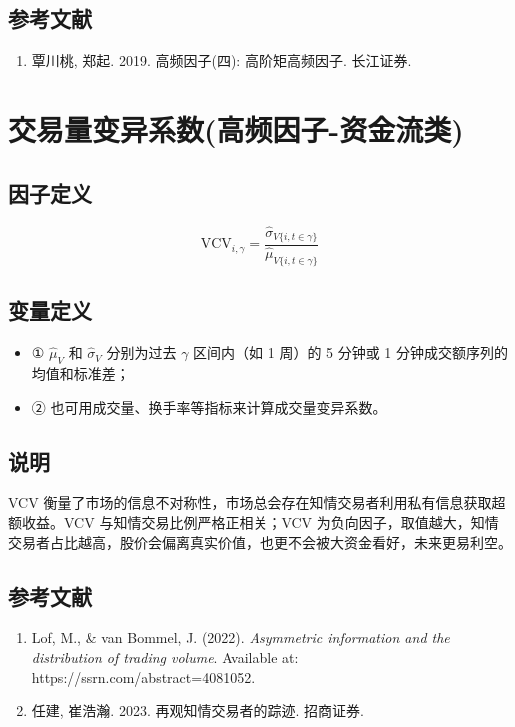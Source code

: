 \documentclass{article}
\begin{document}
\subsection{参考文献}
\begin{enumerate}
    \item 覃川桃, 郑起. 2019. 高频因子(四): 高阶矩高频因子. 长江证券.
\end{enumerate}

\section{交易量变异系数(高频因子-资金流类)}

\subsection{因子定义}
\begin{equation}
    \mathrm{VCV}_{i,\gamma} = \frac{\hat{\sigma}_{V\{i,t \in \gamma\}}}{\hat{\mu}_{V\{i,t \in \gamma\}}}
\end{equation}

\subsection{变量定义}
\begin{itemize}
    \item ① \( \hat{\mu}_V \) 和 \( \hat{\sigma}_V \) 分别为过去 \( \gamma \) 区间内（如 1 周）的 5 分钟或 1 分钟成交额序列的均值和标准差；
    \item ② 也可用成交量、换手率等指标来计算成交量变异系数。
\end{itemize}

\subsection{说明}
VCV 衡量了市场的信息不对称性，市场总会存在知情交易者利用私有信息获取超额收益。VCV 与知情交易比例严格正相关；VCV 为负向因子，取值越大，知情交易者占比越高，股价会偏离真实价值，也更不会被大资金看好，未来更易利空。

\subsection{参考文献}
\begin{enumerate}
    \item Lof, M., \& van Bommel, J. (2022). \textit{Asymmetric information and the distribution of trading volume}. Available at: https://ssrn.com/abstract=4081052.
    \item 任建, 崔浩瀚. 2023. 再观知情交易者的踪迹. 招商证券.
\end{enumerate}
\end{document}
